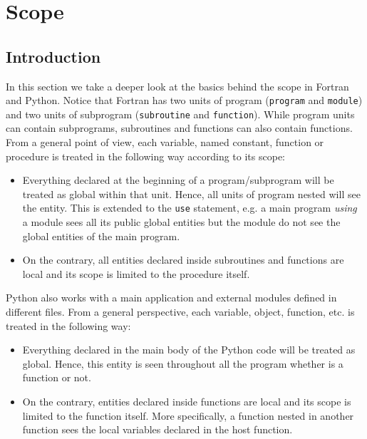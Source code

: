 \chapter{Scope} 
    \vspace{-1cm}
    \section{Introduction}

In this section we take a deeper look at the basics behind the scope in Fortran and Python. 
Notice that Fortran has two units of program (\texttt{program} and \texttt{module}) and 
two units of subprogram (\texttt{subroutine} and \texttt{function}).
While program units can contain subprograms, subroutines and functions can also contain functions. 
From a general point of view, each variable, named constant, function or procedure is treated in the following way according to its scope:
\vspace{-0.5cm}
\begin{itemize}[noitemsep]
    \item Everything declared at the beginning of a program/subprogram will be treated as global within that unit. 
    Hence, all units of program nested will see the entity.
    This is extended to the \texttt{use} statement, e.g. a main program \textit{using} a module sees all its public global entities but the module do not see the global entities of the main program. 
    
    \item On the contrary, all entities declared inside subroutines and functions are local and its scope is limited to the procedure itself. 
\end{itemize}

Python also works with a main application and external modules defined in different files. 
From a general perspective, each variable, object, function, etc. is treated in the following way:
\vspace{-0.5cm}
\begin{itemize}[noitemsep]
    \item Everything declared in the main body of the Python code will be treated as global. 
    Hence, this entity is seen throughout all the program whether is a function or not.
    
    \item On the contrary, entities declared inside functions are local and its scope is limited to the function itself. 
    More specifically, a function nested in another function sees the local variables declared in the host function.
\end{itemize}



